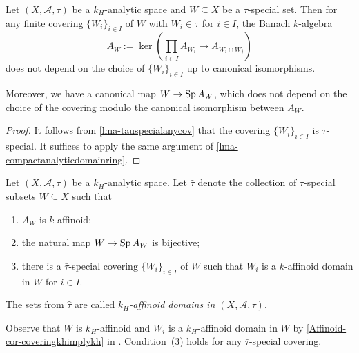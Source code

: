 \begin{lemma}\label{lma-AWspecial}
    Let  $(X,\mathcal{A},\tau)$ be a $k_H$-analytic space and $W\subseteq X$ be a $\tau$-special set. Then for any finite covering $\{W_i\}_{i\in I}$ of $W$ with $W_i\in \tau$ for $i\in I$, the Banach $k$-algebra
    \[
        A_W:=\ker\left(\prod_{i\in I}A_{W_i}\rightarrow A_{W_i\cap W_j}  \right)
    \]
    does not depend on the choice of $\{W_i\}_{i\in I}$ up to canonical isomorphisms.

    Moreover, we have a canonical map $W\rightarrow \operatorname{Sp} A_W$, which does not depend on the choice of the covering modulo the canonical isomorphism between $A_W$.
\end{lemma}
\begin{proof}
    It follows from \cref{lma-tauspecialanycov} that the covering $\{W_i\}_{i\in I}$ is $\tau$-special. It suffices to apply the same argument of \cref{lma-compactanalyticdomainring}.
\end{proof}

\begin{definition}\label{def-tauhat}
    Let  $(X,\mathcal{A},\tau)$ be a $k_H$-analytic space. Let $\hat{\tau}$ denote the collection of $\bar{\tau}$-special subsets $W\subseteq X$ such that 
    \begin{enumerate}
        \item $A_W$ is $k$-affinoid;
        \item the natural map $W\rightarrow \operatorname{Sp} A_W$ is bijective;
        \item there is a $\bar{\tau}$-special covering $\{W_i\}_{i\in I}$ of $W$ such that $W_i$ is a $k$-affinoid domain in $W$ for $i\in I$.
    \end{enumerate}

    The sets from $\hat{\tau}$ are called \emph{$k_H$-affinoid domains in $(X,\mathcal{A},\tau)$}.
\end{definition}
Observe that $W$ is $k_H$-affinoid and $W_i$ is a $k_H$-affinoid domain in $W$ by \cref{Affinoid-cor-coveringkhimplykh} in . Condition~(3) holds for any $\bar{\tau}$-special covering.




